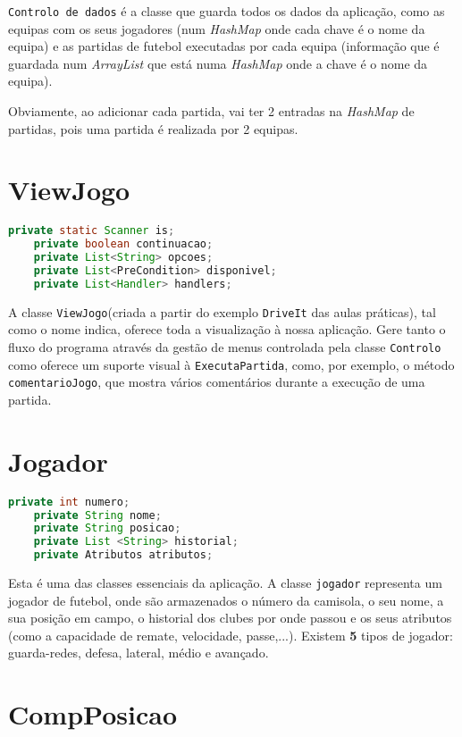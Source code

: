 \documentclass[a4paper]{report}
\begin{document}
\texttt{Controlo de dados} é a classe que guarda todos os dados da aplicação, como as equipas com os seus jogadores (num \textit{HashMap} onde cada chave é o nome da equipa) e as partidas de futebol executadas por cada equipa (informação que é guardada num \textit{ArrayList} que está numa \textit{HashMap} onde a chave é o nome da equipa). \par
Obviamente, ao adicionar cada partida, vai ter 2 entradas na \textit{HashMap} de partidas, pois uma partida é realizada por 2 equipas.
	
	\section{ViewJogo}
	\begin{lstlisting}[language=Java]
    private static Scanner is;
    private boolean continuacao;
    private List<String> opcoes;        
    private List<PreCondition> disponivel; 
    private List<Handler> handlers;     
	\end{lstlisting}
	A classe \texttt{ViewJogo}(criada a partir do exemplo \texttt{DriveIt} das aulas práticas), tal como o nome indica, oferece toda a visualização à nossa aplicação. Gere tanto o fluxo do programa através da gestão de menus controlada pela classe \texttt{Controlo} como oferece um suporte visual à \texttt{ExecutaPartida}, como, por exemplo, o método \texttt{comentarioJogo}, que mostra vários comentários durante a execução de uma partida.  

    \section{Jogador}
    \begin{lstlisting}[language=Java]
    private int numero; 
    private String nome; 
    private String posicao; 
    private List <String> historial; 
    private Atributos atributos; 
    \end{lstlisting}
    
      Esta é uma das classes essenciais da aplicação. A classe \texttt{jogador} representa um jogador de futebol, onde são armazenados o número da camisola, o seu nome, a sua posição em campo, o historial dos clubes por onde passou e os seus atributos (como a capacidade de remate, velocidade, passe,...). Existem \textbf{5} tipos de jogador: guarda-redes, defesa, lateral, médio e avançado.
      
      
    \section{CompPosicao}
    
\end{document}

